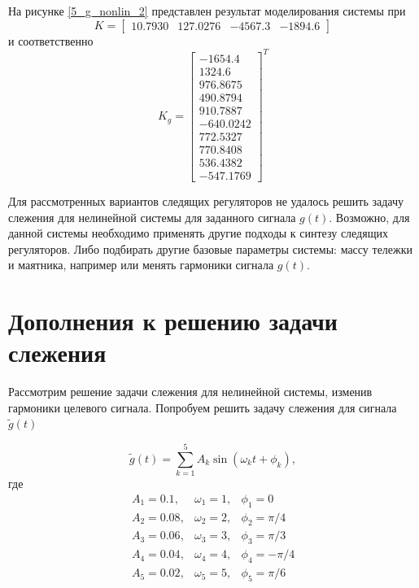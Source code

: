 На рисунке \ref{5_g_nonlin_2} представлен результат моделирования системы при 
\begin{equation}
	K = \begin{bmatrix}
		10.7930& 127.0276& -4567.3 &-1894.6
	\end{bmatrix}
\end{equation}
и соответственно
\begin{equation}
	K_g = \begin{bmatrix}
		-1654.4\\	1324.6\\	976.8675\\	490.8794\\	910.7887\\	-640.0242\\	772.5327\\	770.8408\\	536.4382\\	-547.1769
	\end{bmatrix}^T
\end{equation}


Для рассмотренных вариантов следящих регуляторов не удалось решить задачу слежения для нелинейной системы для заданного сигнала $g(t)$. Возможно, для данной системы необходимо применять другие подходы к синтезу следящих регуляторов. Либо подбирать другие базовые параметры системы: массу тележки и маятника, например или менять гармоники сигнала $g(t)$.

\section{Дополнения к решению задачи слежения} 
Рассмотрим решение задачи слежения для нелинейной системы, изменив гармоники целевого сигнала.
Попробуем решить задачу слежения для сигнала $\tilde{g}(t)$

\begin{equation}
	\tilde{g}(t) = \sum \limits_{k=1}^5 A_k \sin(\omega_kt+\phi_k),
\end{equation}
где
\begin{equation}
	\begin{matrix}
		A_1 = 0.1, & \omega_1 = 1, & \phi_1 = 0\\
		A_2 = 0.08, & \omega_2 = 2, & \phi_2 = \pi /4\\
		A_3 = 0.06, & \omega_3 = 3, & \phi_3 = \pi /3\\
		A_4 = 0.04, & \omega_4 = 4, & \phi_4 = -\pi/4\\
		A_5= 0.02, & \omega_5 = 5, & \phi_5 = \pi / 6\\
	\end{matrix}
\end{equation}

